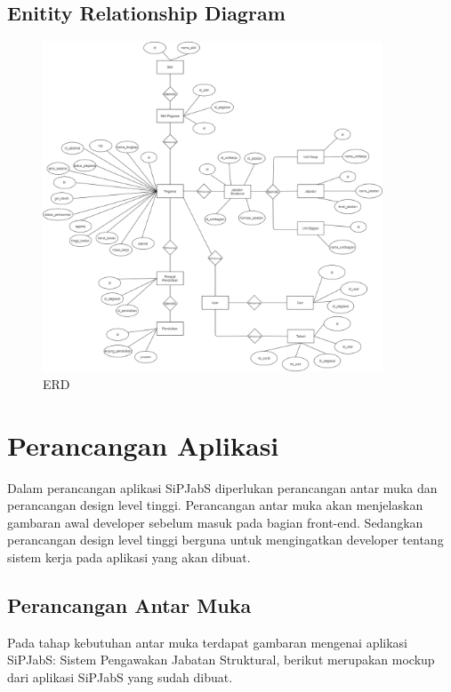 \subsection{Enitity Relationship Diagram}

\begin{figure}
	\centering
	\includegraphics[width=0.9\textwidth]
	{pics/diagram/erd.png}
	\caption{ERD}
	\label{fig:32}
\end{figure}

\section{Perancangan Aplikasi}
Dalam perancangan aplikasi SiPJabS diperlukan perancangan antar muka dan perancangan design level tinggi. Perancangan antar muka akan menjelaskan gambaran awal  developer sebelum masuk pada bagian front-end.  Sedangkan perancangan design level tinggi berguna untuk mengingatkan developer tentang sistem kerja pada aplikasi yang akan dibuat.


\subsection{Perancangan Antar Muka}
Pada tahap kebutuhan antar muka terdapat gambaran mengenai aplikasi SiPJabS: Sistem Pengawakan Jabatan Struktural, berikut merupakan mockup dari aplikasi SiPJabS yang sudah dibuat.

